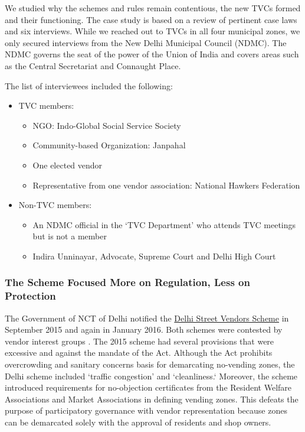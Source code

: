 \documentclass[a4paper, 12pt, twoside, table]{article}
\begin{document}
{{We studied why the schemes and rules remain contentious, the new TVCs formed and their functioning. The case study is based on a review of pertinent case laws and six interviews. While we reached out to TVCs in all four municipal zones, we only secured interviews from the New Delhi Municipal Council (NDMC). The NDMC governs the seat of the power of the Union of India and covers areas such as the Central Secretariat and Connaught Place. 

The list of interviewees included the following:
\begin{itemize}[nosep]
\item TVC members:
\begin{itemize}
\item NGO: Indo-Global Social Service Society
\item Community-based Organization: Janpahal
\item One elected vendor

\item Representative from one vendor association: National Hawkers Federation
\end{itemize}
\item Non-TVC members:
\begin{itemize}
\item An NDMC official in the `TVC Department' who attends TVC meetings but is not a member
\item Indira Unninayar, Advocate, Supreme Court and Delhi High Court
\end{itemize}
\end{itemize}

\subsubsection*{The Scheme Focused More on Regulation, Less on Protection}

The Government of NCT of Delhi notified the \href{http://mohua.gov.in/upload/uploadfiles/files/6(2).pdf}{Delhi Street Vendors Scheme} in September 2015 and again in January 2016. Both schemes were contested by vendor interest groups \parencite{tirkeynews}. The 2015 scheme had several provisions that were excessive and against the mandate of the Act. Although the Act prohibits overcrowding and sanitary concerns basis for demarcating no-vending zones, the Delhi scheme included `traffic congestion' and `cleanliness.` Moreover, the scheme introduced requirements for no-objection certificates from the Resident Welfare Associations and Market Associations in defining vending zones. This defeats the purpose of participatory governance with vendor representation because zones can be demarcated solely with the approval of residents and shop owners. 

}}
\end{document}
